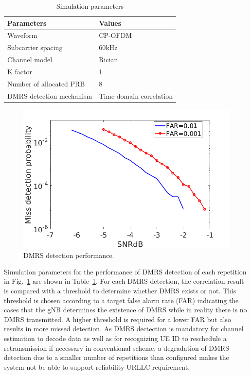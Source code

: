 \documentclass[conference]{IEEEtran}
\begin{document}
\begin{table}[htbp]
\caption{Simulation parameters}
\begin{center}
\begin{tabular}{|p{8em}|p{8em}|}
 \hline
 \textbf{Parameters} & \textbf{Values}\\
 \hline
 Waveform & CP-OFDM\\
 \hline
 Subcarrier spacing & 60kHz\\
 \hline
 Channel model & Rician\\
 \hline
 K factor & 1\\
 \hline
 Number of allocated PRB & 8\\
 \hline
 DMRS detection mechanism & Time-domain correlation\\
 

 
 \hline
\end{tabular}
\label{tab2}
\end{center}
\vspace{-6mm}
\end{table}

\begin{figure}[htbp]
\centerline{\includegraphics[scale=0.22]{fig2.png}}
\caption{DMRS detection performance.}
\label{fig5}
\vspace{-3mm}
\end{figure}

Simulation parameters for the performance of DMRS detection of each repetition in Fig.~\ref{fig5} are shown in Table~\ref{tab2}. For each DMRS detection, the correlation result is compared with a threshold to determine whether DMRS exists or not. This threshold is chosen according to a target false alarm rate (FAR) indicating the cases that the gNB determines the existence of DMRS while in reality there is no DMRS transmitted. A higher threshold is required for a lower FAR but also results in more missed detection. As DMRS dectection is mandatory for channel estimation to decode data as well as for recognizing UE ID to reschedule a retransmission if necessary in conventional scheme, a degradation of DMRS detection due to a smaller number of repetitions than configured makes the system not be able to support reliability URLLC requirement.
\end{document}
